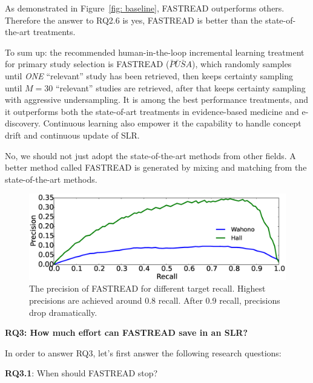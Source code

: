 \documentclass[final,twocolumn,5p]{elsarticle}
\theoremstyle{break}
\begin{document}
As demonstrated in Figure~\ref{fig: baseline}, FASTREAD outperforms others. Therefore the answer to RQ2.6 is yes, FASTREAD is better than the state-of-the-art treatments. 


To sum up: the recommended human-in-the-loop incremental learning treatment for primary study selection is FASTREAD ($\bar{P}\bar{U}\bar{S}A$), which randomly samples until {\em ONE}
``relevant'' study has been retrieved, then keeps certainty sampling until $M=30$ ``relevant'' studies are retrieved, after that keeps certainty sampling with aggressive undersampling. It is among the best performance treatments, and it outperforms both the state-of-art treatments in evidence-based medicine and e-discovery. Continuous learning also empower it the capability to handle concept drift and continuous update of SLR. 



\begin{lesson}
    No, we should not just adopt the state-of-the-art methods from other fields. A better method called FASTREAD is generated by mixing and matching from the state-of-the-art methods.
\end{lesson}





\begin{figure}[t]
    \centering
    \includegraphics[width=\linewidth]{PoR.eps}
    \caption{The precision of FASTREAD for different target recall. Highest precisions are achieved around 0.8 recall. After 0.9 recall, precisions drop dramatically.}
    \label{fig:precision}
\end{figure}

\textbf{RQ3: How much effort can FASTREAD save in an SLR?}

In order to answer RQ3, let's first answer the following research questions:

\textbf{RQ3.1}: When should FASTREAD stop?
\end{document}
